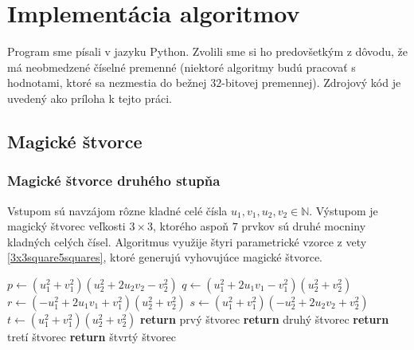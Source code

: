 \chapter{Implementácia algoritmov}

\label{kap:implementation} %

Program sme písali v jazyku Python. Zvolili sme si ho predovšetkým z dôvodu, že má neobmedzené číselné premenné (niektoré algoritmy budú pracovať s hodnotami, ktoré sa nezmestia do bežnej $32$-bitovej premennej). Zdrojový kód je uvedený ako príloha k tejto práci.

\section{Magické štvorce}

\subsection{Magické štvorce druhého stupňa}

\begin{alg} 
\label{algsquare3x3uvw}
Vstupom sú navzájom rôzne kladné celé čísla $u_1, v_1, u_2, v_2 \in \mathbb{N}$. Výstupom je magický štvorec veľkosti $3 \times 3$, ktorého aspoň $7$ prvkov sú druhé mocniny kladných celých čísel. Algoritmus využije štyri parametrické vzorce z vety \ref{3x3square5squares}, ktoré generujú vyhovujúce magické štvorce.
\end{alg}

\begin{algorithmic}
\State $p \gets (u_1^2 + v_1^2)(u_2^2 + 2u_2 v_2 - v_2^2)$
\State $q \gets (u_1^2 + 2u_1 v_1 - v_1^2)(u_2^2 + v_2^2)$
\State $r \gets (- u_1^2 + 2u_1 v_1 + v_1^2)(u_2^2 + v_2^2)$
\State $s \gets (u_1^2 + v_1^2)(-u_2^2 + 2u_2 v_2 + v_2^2)$
\State $t \gets (u_1^2 + v_1^2)(u_2^2 + v_2^2)$
    \STATE \textbf{return} prvý štvorec
\ENDIF
{}
    \STATE \textbf{return} druhý štvorec
\ENDIF
{}
    \STATE \textbf{return} tretí štvorec
\ENDIF
{}
    \STATE \textbf{return} štvrtý štvorec
\ENDIF
\end{algorithmic}


